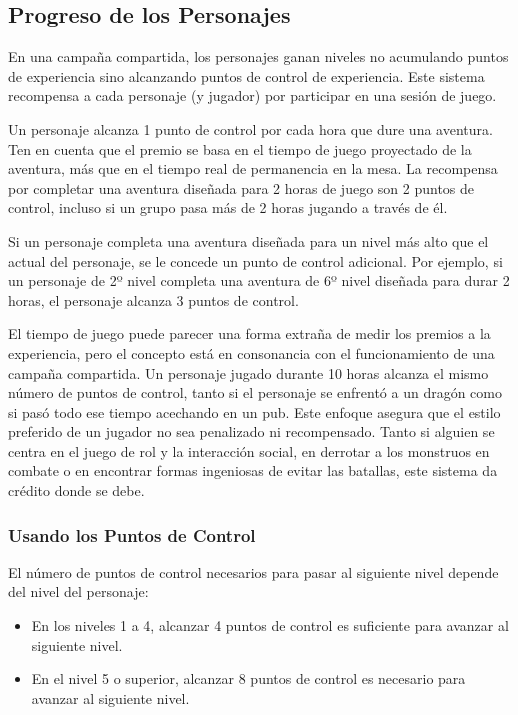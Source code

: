 \documentclass[a4paper,twocolumn,openany,10pt]{dndbook}
\begin{document}
\subsection*{Progreso de los Personajes}
En una campaña compartida, los personajes ganan niveles no acumulando puntos de experiencia sino alcanzando puntos de control de
experiencia. Este sistema recompensa a cada personaje (y jugador) por participar en una sesión de juego.

Un personaje alcanza 1 punto de control por cada hora que dure una aventura. Ten en cuenta que el premio se basa en el tiempo de
juego proyectado de la aventura, más que en el tiempo real de permanencia en la mesa. La recompensa por completar una aventura
diseñada para 2 horas de juego son 2 puntos de control, incluso si un grupo pasa más de 2 horas jugando a través de él.

Si un personaje completa una aventura diseñada para un nivel más alto que el actual del personaje, se le concede un punto de
control adicional. Por ejemplo, si un personaje de 2º nivel completa una aventura de 6º nivel diseñada para durar 2 horas, el
personaje alcanza 3 puntos de control.

El tiempo de juego puede parecer una forma extraña de medir los premios a la experiencia, pero el concepto está en consonancia
con el funcionamiento de una campaña compartida. Un personaje jugado durante 10 horas alcanza el mismo número de puntos de
control, tanto si el personaje se enfrentó a un dragón como si pasó todo ese tiempo acechando en un pub. Este enfoque asegura
que el estilo preferido de un jugador no sea penalizado ni recompensado. Tanto si alguien se centra en el juego de rol y la
interacción social, en derrotar a los monstruos en combate o en encontrar formas ingeniosas de evitar las batallas, este sistema
da crédito donde se debe. 

\subsubsection*{Usando los Puntos de Control}
El número de puntos de control necesarios para pasar al siguiente nivel depende del nivel del personaje:

\begin{itemize}
	\item  En los niveles 1 a 4, alcanzar 4 puntos de control es suficiente para avanzar al siguiente nivel.
	\item  En el nivel 5 o superior, alcanzar 8 puntos de control es necesario para avanzar al siguiente nivel.
\end{itemize}
\end{document}
